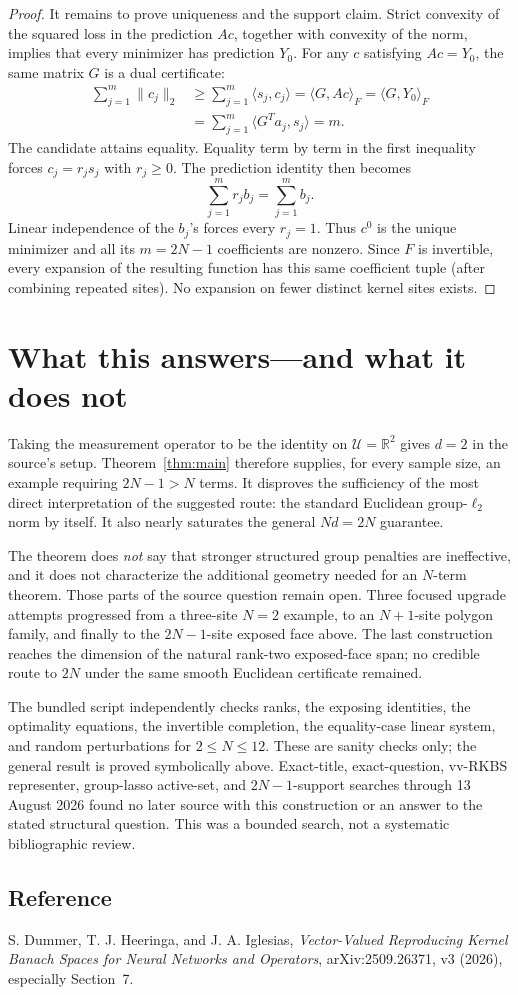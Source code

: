 \documentclass[11pt]{article}
\newcommand{\R}{\mathbb R}
\newcommand{\U}{\mathcal U}
\newcommand{\ip}[2]{\langle #1,#2\rangle}
\begin{document}
\begin{proof}
It remains to prove uniqueness and the support claim.  Strict convexity of
the squared loss in the prediction \(Ac\), together with convexity of the
norm, implies that every minimizer has prediction \(Y_0\).  For any
\(c\) satisfying \(Ac=Y_0\), the same matrix \(G\) is a dual certificate:
\begin{align*}
 \sum_{j=1}^m\|c_j\|_2
 &\ge \sum_{j=1}^m\ip{s_j}{c_j}
  =\ip{G}{Ac}_F
  =\ip{G}{Y_0}_F\\
 &=\sum_{j=1}^m\ip{G^Ta_j}{s_j}
  =m.
\end{align*}
The candidate attains equality.  Equality term by term in the first
inequality forces \(c_j=r_js_j\) with \(r_j\ge0\).  The prediction identity
then becomes
\[
 \sum_{j=1}^m r_jb_j=\sum_{j=1}^m b_j.
\]
Linear independence of the \(b_j\)'s forces every \(r_j=1\).  Thus \(c^0\)
is the unique minimizer and all its \(m=2N-1\) coefficients are nonzero.
Since \(F\) is invertible, every expansion of the resulting function has
this same coefficient tuple (after combining repeated sites).  No expansion
on fewer distinct kernel sites exists.
\end{proof}

\small
\section*{What this answers---and what it does not}
Taking the measurement operator to be the identity on \(\U=\R^2\) gives
\(d=2\) in the source's setup.  Theorem~\ref{thm:main} therefore supplies,
for every sample size, an example requiring \(2N-1>N\) terms.  It disproves
the sufficiency of the most direct interpretation of the suggested route:
the standard Euclidean group-\(\ell_2\) norm by itself.  It also nearly
saturates the general \(Nd=2N\) guarantee.

The theorem does \emph{not} say that stronger structured group penalties are
ineffective, and it does not characterize the additional geometry needed for
an \(N\)-term theorem.  Those parts of the source question remain open.
Three focused upgrade attempts progressed from a three-site \(N=2\) example,
to an \(N+1\)-site polygon family, and finally to the \(2N-1\)-site exposed
face above.  The last construction reaches the dimension of the natural
rank-two exposed-face span; no credible route to \(2N\) under the same smooth
Euclidean certificate remained.

The bundled script independently checks ranks, the exposing identities, the
optimality equations, the invertible completion, the equality-case linear
system, and random perturbations for \(2\le N\le12\).  These are sanity checks
only; the general result is proved symbolically above.  Exact-title,
exact-question, vv-RKBS representer, group-lasso active-set, and
\(2N-1\)-support searches through 13 August 2026 found no later source with
this construction or an answer to the stated structural question.  This was
a bounded search, not a systematic bibliographic review.

\subsection*{Reference}
\noindent [1] S. Dummer, T. J. Heeringa, and J. A. Iglesias,
\emph{Vector-Valued Reproducing Kernel Banach Spaces for Neural Networks and
Operators}, arXiv:2509.26371, v3 (2026), especially Section~7.
\end{document}
